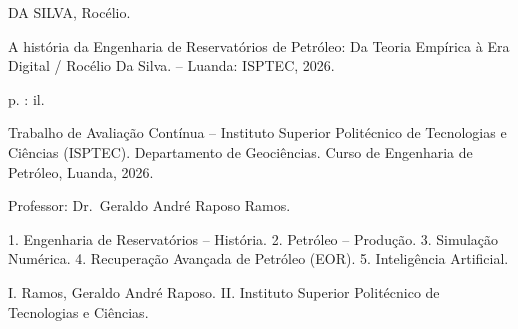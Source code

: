 \documentclass[
  12pt,
  a4paper,
  oneside,
  brazilian,
  sumario=tradicional
]{abntex2}
\begin{document}
\frenchspacing
\pretextual

\imprimircapa

\imprimirfolhaderosto*

\begin{fichacatalografica}
  \thispagestyle{empty}
  \vspace*{\fill}
  \begin{center}
    \fontsize{9}{9}\selectfont
    \noindent
    DA SILVA, Rocélio.

    A história da Engenharia de Reservatórios de Petróleo: Da Teoria
    Empírica à Era Digital / Rocélio Da Silva. -- Luanda: ISPTEC, 2026.

    \pageref{LastPage} p. : il.

    Trabalho de Avaliação Contínua – Instituto Superior Politécnico de
    Tecnologias e Ciências (ISPTEC). Departamento de Geociências. Curso
    de Engenharia de Petróleo, Luanda, 2026.

    Professor: Dr.\ Geraldo André Raposo Ramos.

    1. Engenharia de Reservatórios -- História. 2. Petróleo -- Produção.
    3. Simulação Numérica. 4. Recuperação Avançada de Petróleo (EOR).
    5. Inteligência Artificial.

    I. Ramos, Geraldo André Raposo. II. Instituto Superior Politécnico
    de Tecnologias e Ciências.
  \end{center}
\end{fichacatalografica}
\end{document}
